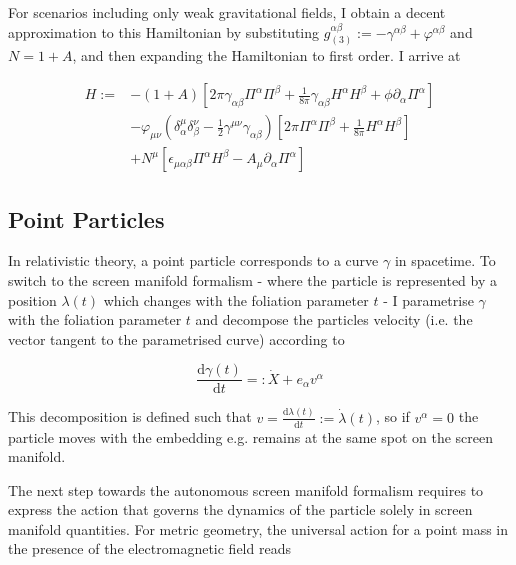 \documentclass[11pt]{article}
\begin{document}
For scenarios including only weak gravitational fields, I obtain a decent approximation to this Hamiltonian by substituting  $g_{(3)}^{\alpha \beta}  := - \gamma^{\alpha \beta} + \varphi^{\alpha \beta}$  and  $ N = 1 + A $, and then expanding the Hamiltonian to first order. I arrive at

\begin{equation}
\begin{split}
	H :=  
	& - \left( 1 + A \right) 
	\left[
	2 \pi \gamma_{\alpha \beta} \Pi^{\alpha} \Pi^{\beta}
	 + \frac{1}{8 \pi} \gamma_{\alpha \beta} H^{\alpha} H^{\beta}
	 + \phi \partial_{\alpha} \Pi^{\alpha}
	 \right]\\
	 & -  \varphi_{\mu \nu} 
	 \left( \delta_{\alpha}^{\mu}  \delta_{\beta}^{\nu} -  \frac{1}{2} \gamma^{\mu \nu } \gamma_{\alpha \beta} \right)
	 \left[
	 2 \pi  \Pi^{\alpha} \Pi^{\beta}
	 + \frac{1}{8 \pi} H^{\alpha} H^{\beta}
	 \right] \\
	 & + N^{\mu} \left[ 
	 \epsilon_{\mu \alpha \beta} \Pi^{\alpha} H^{\beta} -  A_{\mu} \partial_\alpha \Pi^\alpha
	 \right]
\end{split}
\end{equation}



\subsection{Point Particles}

In relativistic theory, a point particle corresponds to a curve $\gamma$ in spacetime. To switch to the screen manifold formalism - where the particle is represented by a position $\lambda (t) $ which changes with the foliation parameter $t$ - I parametrise $\gamma$ with the foliation parameter $t$ and decompose the particles velocity (i.e. the vector tangent to the parametrised curve) according to

\begin{equation}
	\frac{\mathrm{d} \gamma (t)}{\mathrm{d} t } =: \dot{X} +  e_\alpha v^\alpha
\end{equation}

This decomposition is defined such that $v = 	\frac{\mathrm{d} \lambda (t)}{\mathrm{d} t } := \dot{\lambda} (t) $, so if $ v^\alpha = 0 $ the particle  moves with the embedding e.g. remains at the same spot on the screen manifold.

The next step towards the autonomous screen manifold formalism requires to express the action that governs the dynamics of the particle solely in screen manifold quantities. For metric geometry, the universal action for a point mass in the presence of the electromagnetic field reads
\end{document}
